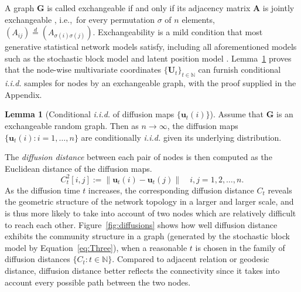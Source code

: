 \documentclass[11pt]{article}
\theoremstyle{definition}
\newtheorem{lemma}[theorem]{Lemma}
\begin{document}
A graph $\mathbf{G}$ is called exchangeable if and only if its adjacency matrix $\mathbf{A}$ is jointly exchangeable \cite{orbanz2015bayesian}, i.e.,~for every permutation $\sigma$ of $n$ elements, $(A_{ij}) \stackrel{d}{=} (A_{\sigma(i) \sigma(j)})$. Exchangeability is a mild condition that most generative statistical network models satisfy, including all aforementioned models such as the stochastic block model and latent position model \cite{rohe2011spectral, sussman2014consistent, todeschini2016exchangeable}. Lemma~\ref{main_lemma} proves that the node-wise multivariate coordinates $\{ \mathbf{U}_{t} \}_{t \in \mathbb{N}}$ can furnish conditional \textit{i.i.d.} samples for nodes by an exchangeable graph, with the proof supplied in the Appendix.
\begin{lemma}[Conditional \textit{i.i.d.} of diffusion maps $\{\mathbf{u}_{t}(i)\}$]
	\label{main_lemma}
	Assume that $\mathbf{G}$ is an exchangeable random graph. Then as $n \rightarrow \infty$, the diffusion maps $\{ \mathbf{u}_{t}(i) : i = 1, \ldots, n \}$ are conditionally \textit{i.i.d.} given its underlying distribution.  
\end{lemma}

The \textit{diffusion distance} between each pair of nodes is then computed as the Euclidean distance of the diffusion maps. 
\begin{equation}
\label{eq:diffusion}
C^2_{t}[i,j]  :=   \parallel \mathbf{u}_{t}(i) - \mathbf{u}_{t}(j) \parallel   \quad i,j = 1,2, \ldots , n.
\end{equation}
As the diffusion time $t$ increases, the corresponding diffusion distance $C_{t}$ reveals the geometric structure of the network topology in a larger and larger scale, and is thus more likely to take into account of two nodes which are relatively difficult to reach each other. Figure~\ref{fig:diffusions} shows how well diffusion distance exhibits the community structure in a graph (generated by the stochastic block model by Equation~\ref{eq:Three}), when a reasonable $t$ is chosen in the family of diffusion distances $\{ C_{t} : t \in \mathbb{N} \}$. Compared to adjacent relation or geodesic distance, diffusion distance better reflects the connectivity since it takes into account every possible path between the two nodes. 
\end{document}
